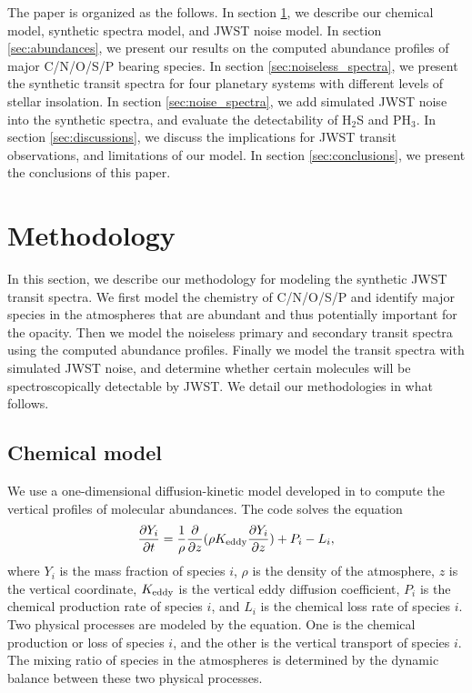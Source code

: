 \documentclass[twocolumn]{aastex61}
\begin{document}
The paper is organized as the follows. In section \ref{sec:method}, we describe our chemical model, synthetic spectra model, and JWST noise model. In section \ref{sec:abundances}, we present our results on the computed abundance profiles of major C/N/O/S/P bearing species. In section \ref{sec:noiseless_spectra}, we present the synthetic transit spectra for four planetary systems with different levels of stellar insolation. In section \ref{sec:noise_spectra}, we add simulated JWST noise into the synthetic spectra, and evaluate the detectability of H$_2$S and PH$_3$. In section \ref{sec:discussions}, we discuss the implications for JWST transit observations, and limitations of our model. In section \ref{sec:conclusions}, we present the conclusions of this paper. 

\section{Methodology}\label{sec:method}

In this section, we describe our methodology for modeling the synthetic JWST transit spectra. We first model the chemistry of C/N/O/S/P and identify major species in the atmospheres that are abundant and thus potentially important for the opacity. Then we model the noiseless primary and secondary transit spectra using the computed abundance profiles. Finally we model the transit spectra with simulated JWST noise, and determine whether certain molecules will be spectroscopically detectable by JWST. We detail our methodologies in what follows. 

\subsection{Chemical model}\label{subsec:chem_model}

We use a one-dimensional diffusion-kinetic model developed in \citet{Wang15,Wang16} to compute the vertical profiles of molecular abundances. The code solves the equation
\begin{equation}\label{eqn:DK}
\frac{\partial{Y_i}}{\partial{t}} = \frac{1}{\rho} \frac{\partial}{\partial{z}}(\rho K_{\rm eddy} \frac{\partial{Y_i}}{\partial{z}}) + P_i - L_i,
\end{equation} 
where $Y_i$ is the mass fraction of species $i$, $\rho$ is the density of the atmosphere, $z$ is the vertical coordinate, $K_{\rm eddy}$ is the vertical eddy diffusion coefficient, $P_i$ is the 
chemical production rate of species $i$, and $L_i$ is the chemical loss rate of species $i$. 
Two physical processes are modeled by the equation. One is the chemical production or loss of species $i$, and the other is the vertical transport of species $i$. The mixing ratio of species in the atmospheres is determined by the dynamic balance between these two physical processes. 
\end{document}
